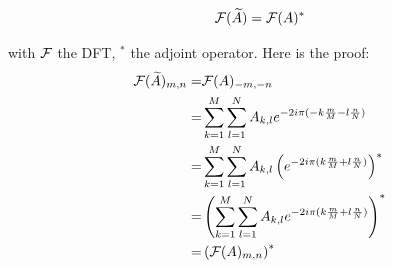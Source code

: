 $${\mathcal F}(\widetilde{A}) = {\mathcal F}(A)^*$$

with ${\mathcal F}$ the \ac{DFT}, $^*$ the adjoint operator. Here is the proof:
\begin{align*}
{\mathcal F}({\widetilde{A}})_{m,n} =& {\mathcal F}(A)_{-m,-n} \\
=& \sum_{k=1}^M \sum_{l=1}^N A_{k,l} e^{-2i\pi (-k\frac{m}{M}-l \frac{n}{N})}\\
=& \sum_{k=1}^M \sum_{l=1}^N A_{k,l} \left( e^{-2i\pi (k\frac{m}{M}+l \frac{n}{N})} \right)^*\\
=& \left( \sum_{k=1}^M \sum_{l=1}^N A_{k,l} e^{-2i\pi (k\frac{m}{M}+l \frac{n}{N})} \right)^*\\
=& \left( {\mathcal F}(A)_{m,n} \right)^*
\end{align*}



\printglossary
{\let\clearpage\relax \printacronyms}
\printbibliography[title=References]






